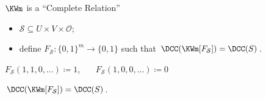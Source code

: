\begin{frame}{$\KWm$ is a ``Complete Relation''}

    \begin{itemize}
        \item $\mathcal{S} \subseteq U \times V \times \mathcal{O}$;
        \item define $F_{\mathcal{S}}\colon \{0, 1\}^m \to \{0, 1\}$ such that
            $\DCC(\KWm[F_{\mathcal{S}}]) = \DCC(S)$.
    \end{itemize}

    \pause

    \vspace{-0.2cm}
    \begin{center}
        
    \end{center}

    \pause
    $F_{\mathcal{S}}(1, 1, 0, \dots) \coloneqq 1$\pause, ~~~$F_{\mathcal{S}}(1, 0, 0, \dots) \coloneqq 0$

    \pause
    \begin{lemma}
        $\DCC(\KWm[F_{\mathcal{S}}]) = \DCC(S)$.
    \end{lemma}

    \pause

\end{frame}

